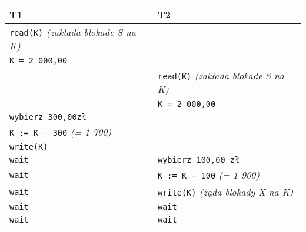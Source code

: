 \documentclass[a5paper,6pt]{article}
\begin{document}
    \begin{center}
    \begin{tabular}{|p{5cm}|p{5cm}|}
        \hline
        \textbf{T1} & \textbf{T2} \\
        \hline
        \texttt{read(K)} \textit{(zakłada blokade S na K)} & \texttt{}\\
        \texttt{K = 2 000,00} & \texttt{}\\
        \texttt{} & \texttt{read(K)} \textit{(zakłada blokade S na K)}\\
        \texttt{} & \texttt{K = 2 000,00}\\
        \texttt{wybierz 300,00zł} & \texttt{}\\
        \texttt{K := K - 300} \textit{(= 1 700)}& \texttt{}\\
        \texttt{write(K)} & \texttt{}\\
        \texttt{wait} & \texttt{wybierz 100,00 zł}\\
        \texttt{wait} & \texttt{K := K - 100} \textit{(= 1 900)}\\
        \texttt{wait} & \texttt{write(K)} \textit{(żąda blokady X na K)}\\
        \texttt{wait} & \texttt{wait}\\
        \texttt{wait} & \texttt{wait}\\
        \hline
    \end{tabular}
    \end{center}
\end{document}
